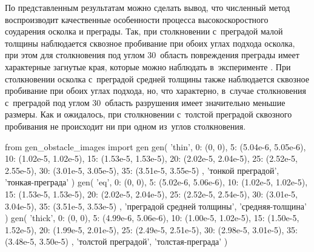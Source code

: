 \documentclass[thesis.tex]{subfiles}
\begin{document}
По представленным результатам можно сделать вывод, что численный метод воспроизводит качественные особенности процесса
высокоскоростного соударения осколка и преграды. Так, при столкновении с~преградой малой толщины наблюдается сквозное
пробивание при обоих углах подхода осколка, при этом для столкновения под углом 30\degree\ область повреждения преграды
имеет характерные загнутые края, которые можно наблюдать в~эксперименте \cite{губеладзе2010исследование}. При
столкновении осколка с~преградой средней толщины также наблюдается сквозное пробивание при обоих углах подхода, но, что
характерно, в~случае столкновения с~преградой под углом 30\degree\ область разрушения имеет значительно меньшие размеры.
Как и ожидалось, при столкновении с~толстой преградой сквозного пробивания не происходит ни при одном из~углов
столкновения.

\begin{python}
from gen_obstacle_images import gen
gen(
    'thin',
    {
        0:  (0, 0),
        5:  (5.04e-6, 5.05e-6),
        10: (1.02e-5, 1.02e-5),
        15: (1.53e-5, 1.53e-5),
        20: (2.02e-5, 2.04e-5),
        25: (2.52e-5, 2.55e-5),
        30: (3.01e-5, 3.05e-5),
        35: (3.51e-5, 3.55e-5)
    },
    'тонкой преградой',
    'тонкая-преграда'
)
gen(
    'eq',
    {
        0:  (0, 0),
        5:  (5.02e-6, 5.06e-6),
        10: (1.02e-5, 1.02e-5),
        15: (1.53e-5, 1.53e-5),
        20: (2.02e-5, 2.04e-5),
        25: (2.52e-5, 2.54e-5),
        30: (3.01e-5, 3.04e-5),
        35: (3.51e-5, 3.53e-5)
    },
    'преградой средней толщины',
    'средняя-толщина'
)
gen(
    'thick',
    {
        0:  (0, 0),
        5:  (4.99e-6, 5.06e-6),
        10: (1.00e-5, 1.02e-5),
        15: (1.50e-5, 1.52e-5),
        20: (1.99e-5, 2.01e-5),
        25: (2.49e-5, 2.51e-5),
        30: (2.98e-5, 3.01e-5),
        35: (3.48e-5, 3.50e-5)
    },
    'толстой преградой',
    'толстая-преграда'
)
\end{python}
\end{document}
